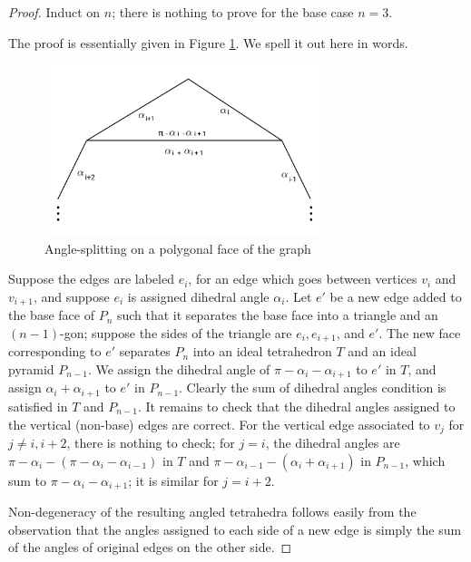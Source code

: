 \documentclass[11pt]{amsart}
\theoremstyle{plain}
\theoremstyle{definition}
\begin{document}
\begin{proof}
Induct on $n$; there is nothing to prove for the base case $n=3$.


The proof is essentially given in Figure \ref{f:ideal_pyramid_arg}.
We spell it out here in words.


\begin{figure}
\includegraphics[height=5cm]{angle_split.png}
\caption{Angle-splitting on a polygonal face of the graph}
\label{f:ideal_pyramid_arg}
\end{figure}


Suppose the edges are labeled $e_i$, for an edge
which goes between vertices $v_i$ and $v_{i+1}$,
and suppose $e_i$ is assigned dihedral angle $\alpha_i$.
Let $e'$ be a new edge added to the base face of $P_n$
such that it separates the base face into a triangle and
an $(n-1)$-gon;
suppose the sides of the triangle are
$e_i, e_{i+1}$, and $e'$.
The new face corresponding to $e'$ separates $P_n$ into
an ideal tetrahedron $T$ and an ideal pyramid $P_{n-1}$.
We assign the dihedral angle of $\pi - \alpha_i - \alpha_{i+1}$
to $e'$ in $T$, and assign $\alpha_i + \alpha_{i+1}$ to $e'$ in $P_{n-1}$.
Clearly the sum of dihedral angles condition is satisfied
in $T$ and $P_{n-1}$.
It remains to check that the dihedral angles assigned to the vertical (non-base)
edges are correct.
For the vertical edge associated to $v_j$ for $j \neq i, i+2$,
there is nothing to check;
for $j = i$, the dihedral angles are
$\pi - \alpha_i - (\pi - \alpha_i - \alpha_{i-1})$
in $T$ and $\pi - \alpha_{i-1} - (\alpha_i + \alpha_{i+1})$ in $P_{n-1}$,
which sum to $\pi - \alpha_i - \alpha_{i+1}$;
it is similar for $j = i+2$.


Non-degeneracy of the resulting angled tetrahedra
follows easily from the observation that the angles
assigned to each side of a new edge is simply the sum
of the angles of original edges on the other side.
\end{proof}


\end{document}
